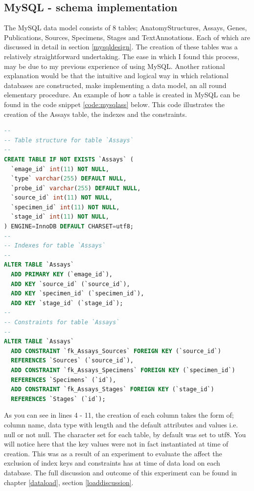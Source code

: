 \subsection{MySQL - schema implementation}
The MySQL data model consists of 8 tables; AnatomyStructures, Assays, Genes, Publications, Sources, Specimens, Stages and TextAnnotations. Each of which are discussed in detail in section \ref{mysqldesign}. The creation of these tables was a relatively straightforward undertaking. The ease in which I found this process, may be due to my previous experience of using MySQL. Another rational explanation would be that the intuitive and logical way in which relational databases are constructed, make implementing a data model, an all round elementary procedure. An example of how a table is created in MySQL can be found in the code snippet \ref{code:mysqlass} below. This code illustrates the creation of the Assays table, the indexes and the constraints.
\newpage
\vspace*{\fill}
\begin{lstlisting}[language=SQL, caption=Creation of Assays table in MySQL., label=code:mysqlass]
--
-- Table structure for table `Assays`
--
CREATE TABLE IF NOT EXISTS `Assays` (
  `emage_id` int(11) NOT NULL,
  `type` varchar(255) DEFAULT NULL,
  `probe_id` varchar(255) DEFAULT NULL,
  `source_id` int(11) NOT NULL,
  `specimen_id` int(11) NOT NULL,
  `stage_id` int(11) NOT NULL,
) ENGINE=InnoDB DEFAULT CHARSET=utf8;
--
-- Indexes for table `Assays`
--
ALTER TABLE `Assays`
  ADD PRIMARY KEY (`emage_id`),
  ADD KEY `source_id` (`source_id`),
  ADD KEY `specimen_id` (`specimen_id`),
  ADD KEY `stage_id` (`stage_id`);
--
-- Constraints for table `Assays`
--
ALTER TABLE `Assays`
  ADD CONSTRAINT `fk_Assays_Sources` FOREIGN KEY (`source_id`)
  REFERENCES `Sources` (`source_id`),
  ADD CONSTRAINT `fk_Assays_Specimens` FOREIGN KEY (`specimen_id`)
  REFERENCES `Specimens` (`id`),
  ADD CONSTRAINT `fk_Assays_Stages` FOREIGN KEY (`stage_id`)
  REFERENCES `Stages` (`id`);
\end{lstlisting}
\vspace*{\fill}
\newpage

As you can see in lines 4 - 11, the creation of each column takes the form of; column name, data type with length and the default attributes and values i.e. null or not null. The character set for each table, by default was set to utf8. You will notice here that the key values were not in fact instantiated at time of creation. This was as a result of an experiment to evaluate the affect the exclusion of index keys and constraints has at time of data load on each database. The full discussion and outcome of this experiment can be found in chapter \ref{dataload}, section \ref{loaddiscussion}.

